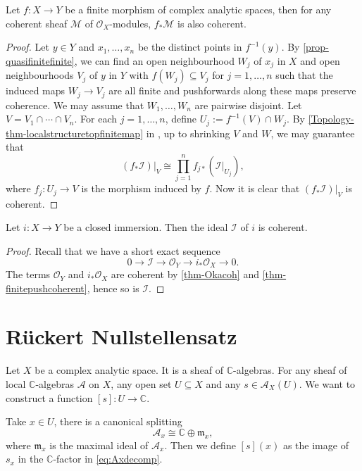 \begin{theorem}\label{thm-finitepushcoherent}
    Let $f:X\rightarrow Y$ be a finite morphism of complex analytic spaces, then for any coherent sheaf $\mathcal{M}$ of $\mathcal{O}_X$-modules, $f_*\mathcal{M}$ is also coherent.
\end{theorem}
\begin{proof}
    Let $y\in Y$ and $x_1,\ldots,x_n$ be the distinct points in $f^{-1}(y)$. By \cref{prop-quasifinitefinite}, we can find an open neighbourhood $W_j$ of $x_j$ in $X$ and open neighbourhoods $V_j$ of $y$ in $Y$ with $f(W_j)\subseteq V_j$ for $j=1,\ldots,n$ such that the induced maps $W_j\rightarrow V_j$ are all finite and pushforwards along these maps preserve coherence. We may assume that $W_1,\ldots,W_n$ are pairwise disjoint.
    Let $V=V_1\cap \cdots\cap V_n$. For each $j=1,\ldots,n$, define $U_j:=f^{-1}(V)\cap W_j$. By \cref{Topology-thm-localstructuretopfinitemap} in , up to shrinking $V$ and $W$, we may guarantee that
    \[
        (f_*\mathcal{I})|_V\cong \prod_{j=1}^n f_{j*}(\mathcal{I}|_{U_j}),
    \]
    where $f_j:U_j\rightarrow V$ is the morphism induced by $f$. Now it is clear that $(f_*\mathcal{I})|_V$ is coherent.
\end{proof}
\begin{corollary}
    Let $i:X\rightarrow Y$ be a closed immersion. Then the ideal $\mathcal{I}$ of $i$ is coherent.
\end{corollary}
\begin{proof}
    Recall that we have a short exact sequence 
    \[
        0\rightarrow \mathcal{I} \rightarrow \mathcal{O}_Y\rightarrow i_*\mathcal{O}_X\rightarrow 0.
    \]
    The terms $\mathcal{O}_Y$ and $i_*\mathcal{O}_X$ are coherent by \cref{thm-Okacoh} and \cref{thm-finitepushcoherent}, hence so is $\mathcal{I}$.
\end{proof}

\section{Rückert Nullstellensatz}

Let $X$ be a complex analytic space. It is a sheaf of $\mathbb{C}$-algebras.
For any sheaf of local $\mathbb{C}$-algebras $\mathcal{A}$ on $X$, any open set $U\subseteq X$ and any $s\in \mathcal{A}_X(U)$. We want to construct a function $[s]:U\rightarrow \mathbb{C}$.

Take $x\in U$, there is a canonical splitting
\begin{equation}\label{eq:Axdecomp}
  \mathcal{A}_{x}\cong \mathbb{C}\oplus \mathfrak{m}_{x}, 
\end{equation}
where $\mathfrak{m}_x$ is the maximal ideal of $\mathcal{A}_{x}$. Then we define $[s](x)$ as the image of $s_x$ in the $\mathbb{C}$-factor in \eqref{eq:Axdecomp}.

